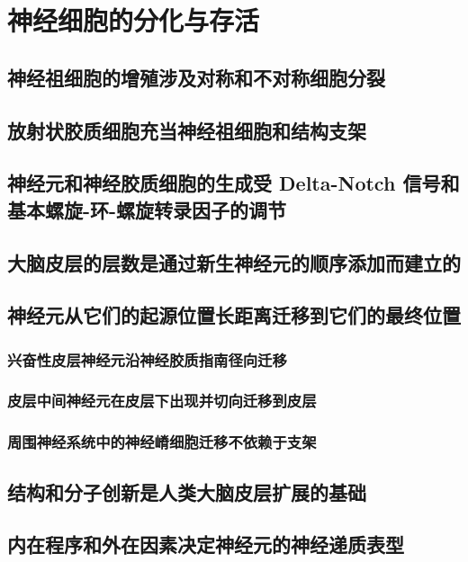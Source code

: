 \chapter{神经细胞的分化与存活}


\section{神经祖细胞的增殖涉及对称和不对称细胞分裂}

\section{放射状胶质细胞充当神经祖细胞和结构支架}

\section{神经元和神经胶质细胞的生成受 Delta-Notch 信号和基本螺旋-环-螺旋转录因子的调节}

\section{大脑皮层的层数是通过新生神经元的顺序添加而建立的}

\section{神经元从它们的起源位置长距离迁移到它们的最终位置}
\subsection{兴奋性皮层神经元沿神经胶质指南径向迁移}
\subsection{皮层中间神经元在皮层下出现并切向迁移到皮层}
\subsection{周围神经系统中的神经嵴细胞迁移不依赖于支架}

\section{结构和分子创新是人类大脑皮层扩展的基础}

\section{内在程序和外在因素决定神经元的神经递质表型}
